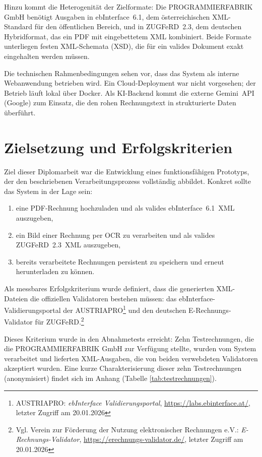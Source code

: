 Hinzu kommt die Heterogenität der Zielformate: Die PROGRAMMIERFABRIK GmbH benötigt Ausgaben in
ebInterface~6.1, dem österreichischen XML-Standard für den öffentlichen Bereich, und in
ZUGFeRD~2.3, dem deutschen Hybridformat, das ein PDF mit eingebettetem XML kombiniert.
Beide Formate unterliegen festen XML-Schemata (XSD), die für ein valides Dokument exakt
eingehalten werden müssen.

Die technischen Rahmenbedingungen sehen vor, dass das System als interne Webanwendung betrieben
wird. Ein Cloud-Deployment war nicht vorgesehen; der Betrieb läuft lokal über Docker.
Als KI-Backend kommt die externe Gemini~API (Google) zum Einsatz, die den rohen Rechnungstext
in strukturierte Daten überführt.

\section{Zielsetzung und Erfolgskriterien}
Ziel dieser Diplomarbeit war die Entwicklung eines funktionsfähigen Prototyps, der den
beschriebenen Verarbeitungsprozess vollständig abbildet. Konkret sollte das System in der
Lage sein:

\begin{enumerate}
    \item eine PDF-Rechnung hochzuladen und als valides ebInterface~6.1~XML auszugeben,
    \item ein Bild einer Rechnung per OCR zu verarbeiten und als valides ZUGFeRD~2.3~XML auszugeben,
    \item bereits verarbeitete Rechnungen persistent zu speichern und erneut herunterladen zu können.
\end{enumerate}

Als messbares Erfolgskriterium wurde definiert, dass die generierten XML-Dateien die offiziellen
Validatoren bestehen müssen: das ebInterface-Validierungsportal der AUSTRIAPRO\footnote{AUSTRIAPRO: \textit{ebInterface Validierungsportal}, \url{https://labs.ebinterface.at/}, letzter Zugriff am 20.01.2026}
und den deutschen E-Rechnungs-Validator für ZUGFeRD.\footnote{Vgl. Verein zur Förderung der Nutzung elektronischer Rechnungen e.V.: \textit{E-Rechnungs-Validator}, \url{https://erechnungs-validator.de/}, letzter Zugriff am 20.01.2026}

Dieses Kriterium wurde in den Abnahmetests erreicht: Zehn Testrechnungen, die die PROGRAMMIERFABRIK GmbH
zur Verfügung stellte, wurden vom System verarbeitet und lieferten XML-Ausgaben, die von beiden  verwebdeten Validatoren akzeptiert wurden.
Eine kurze Charakterisierung dieser zehn Testrechnungen (anonymisiert) findet sich im Anhang (Tabelle \ref{tab:testrechnungen}).

